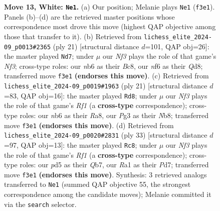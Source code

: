\documentclass[11pt]{article}
\begin{document}
\begin{figure}[p]
\caption{\textbf{Move 13, White: \texttt{Ne1}.} (a) Our position; Melanie plays \texttt{Ne1} (\texttt{f3e1}). Panels (b)--(d) are the retrieved master positions whose correspondence most drove this move (highest QAP objective among those that transfer to it). (b) Retrieved from \texttt{lichess\_elite\_2024-09\_p0013\#2365} (ply 21) [structural distance $d$=101, QAP obj=26]: the master played \texttt{Nd7}; under $\mu$ our \emph{Nf3} plays the role of that game's \emph{Nf3}; cross-type roles: our \emph{n}b6 as their \emph{B}c8, our \emph{n}f6 as their \emph{Q}d8; transferred move \texttt{f3e1} \textbf{(endorses this move)}. (c) Retrieved from \texttt{lichess\_elite\_2024-09\_p0019\#1963} (ply 21) [structural distance $d$=83, QAP obj=16]: the master played \texttt{Rd8}; under $\mu$ our \emph{Nf3} plays the role of that game's \emph{Rf1} (a \textbf{cross-type} correspondence); cross-type roles: our \emph{n}b6 as their \emph{R}a8, our \emph{P}g3 as their \emph{N}b8; transferred move \texttt{f3e1} \textbf{(endorses this move)}. (d) Retrieved from \texttt{lichess\_elite\_2024-09\_p0020\#2831} (ply 33) [structural distance $d$=97, QAP obj=13]: the master played \texttt{Rc8}; under $\mu$ our \emph{Nf3} plays the role of that game's \emph{Rf1} (a \textbf{cross-type} correspondence); cross-type roles: our \emph{p}d5 as their \emph{Q}b7, our \emph{R}a1 as their \emph{P}d7; transferred move \texttt{f3e1} \textbf{(endorses this move)}. Synthesis: 3 retrieved analogs transferred to \texttt{Ne1} (summed QAP objective 55, the strongest correspondence among the candidate moves); Melanie committed it via the \texttt{search} selector.}
\label{fig:thought-m24}
\end{figure}

\clearpage
\end{document}

